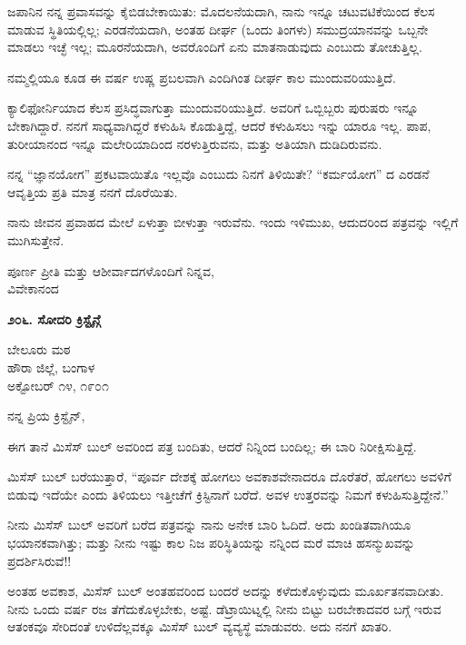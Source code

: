 ಜಪಾನಿನ ನನ್ನ ಪ್ರವಾಸವನ್ನು ಕೈಬಿಡಬೇಕಾಯಿತು: ಮೊದಲನೆಯದಾಗಿ, ನಾನು ಇನ್ನೂ ಚಟುವಟಿಕೆಯಿಂದ ಕೆಲಸ ಮಾಡುವ ಸ್ಥಿತಿಯಲ್ಲಿಲ್ಲ; ಎರಡನೆಯದಾಗಿ, ಅಂತಹ ದೀರ್ಘ (ಒಂದು ತಿಂಗಳು) ಸಮುದ್ರಯಾನವನ್ನು ಒಬ್ಬನೇ ಮಾಡಲು ಇಚ್ಛೆ ಇಲ್ಲ; ಮೂರನೆಯದಾಗಿ, ಅವರೊಂದಿಗೆ ಏನು ಮಾತನಾಡುವುದು ಎಂಬುದು ತೋಚುತ್ತಿಲ್ಲ.

ನಮ್ಮಲ್ಲಿಯೂ ಕೂಡ ಈ ವರ್ಷ ಉಷ್ಣ ಪ್ರಬಲವಾಗಿ ಎಂದಿಗಿಂತ ದೀರ್ಘ ಕಾಲ ಮುಂದುವರಿಯುತ್ತಿದೆ.

ಕ್ಯಾಲಿಫೋರ್ನಿಯಾದ ಕೆಲಸ ಪ್ರಸಿದ್ಧವಾಗುತ್ತಾ ಮುಂದುವರಿಯುತ್ತಿದೆ. ಅವರಿಗೆ ಒಬ್ಬಿಬ್ಬರು ಪುರುಷರು ಇನ್ನೂ ಬೇಕಾಗಿದ್ದಾರೆ. ನನಗೆ ಸಾಧ್ಯವಾಗಿದ್ದರೆ ಕಳುಹಿಸಿ ಕೊಡುತ್ತಿದ್ದೆ, ಆದರೆ ಕಳುಹಿಸಲು ಇನ್ನು ಯಾರೂ ಇಲ್ಲ. ಪಾಪ, ತುರೀಯಾನಂದ ಇನ್ನೂ ಮಲೇರಿಯಾದಿಂದ ನರಳುತ್ತಿರುವನು, ಮತ್ತು ಅತಿಯಾಗಿ ದುಡಿದಿರುವನು.

ನನ್ನ “ಜ್ಞಾನಯೋಗ” ಪ್ರಕಟವಾಯಿತೊ ಇಲ್ಲವೊ ಎಂಬುದು ನಿನಗೆ ತಿಳಿಯಿತೇ? “ಕರ್ಮಯೋಗ” ದ ಎರಡನೆ ಆವೃತ್ತಿಯ ಪ್ರತಿ ಮಾತ್ರ ನನಗೆ ದೊರೆಯಿತು.

ನಾನು ಜೀವನ ಪ್ರವಾಹದ ಮೇಲೆ ಏಳುತ್ತಾ ಬೀಳುತ್ತಾ ಇರುವೆನು. ಇಂದು ಇಳಿಮುಖ, ಆದುದರಿಂದ ಪತ್ರವನ್ನು ಇಲ್ಲಿಗೆ ಮುಗಿಸುತ್ತೇನೆ.

\begin{flushright}
ಪೂರ್ಣ ಪ್ರೀತಿ ಮತ್ತು ಆಶೀರ್ವಾದಗಳೊಂದಿಗೆ ನಿನ್ನವ,\\ವಿವೇಕಾನಂದ
\end{flushright}

\begin{center}
\textbf{೨೦೬. ಸೋದರಿ ಕ್ರಿಸ್ಟೈನ್ಗೆ}
\end{center}

\begin{flushright}
ಬೇಲೂರು ಮಠ\\ಹೌರಾ ಜಿಲ್ಲೆ, ಬಂಗಾಳ\\ಅಕ್ಟೋಬರ್ ೧೪, ೧೯೦೧
\end{flushright}

ನನ್ನ ಪ್ರಿಯ ಕ್ರಿಸ್ಟೈನ್,

ಈಗ ತಾನೆ ಮಿಸೆಸ್ ಬುಲ್ ಅವರಿಂದ ಪತ್ರ ಬಂದಿತು, ಆದರೆ ನಿನ್ನಿಂದ ಬಂದಿಲ್ಲ; ಈ ಬಾರಿ ನಿರೀಕ್ಷಿಸುತ್ತಿದ್ದೆ.

ಮಿಸೆಸ್ ಬುಲ್ ಬರೆಯುತ್ತಾರೆ, “ಪೂರ್ವ ದೇಶಕ್ಕೆ ಹೋಗಲು ಅವಕಾಶವೇನಾದರೂ ದೊರೆತರೆ, ಹೋಗಲು ಅವಳಿಗೆ ಬಿಡುವು ಇದೆಯೇ ಎಂದು ತಿಳಿಯಲು ಇತ್ತೀಚೆಗೆ ಕ್ರಿಸ್ಟಿನಾಗೆ ಬರೆದೆ. ಅವಳ ಉತ್ತರವನ್ನು ನಿಮಗೆ ಕಳುಹಿಸುತ್ತಿದ್ದೇನೆ.”

ನೀನು ಮಿಸೆಸ್ ಬುಲ್ ಅವರಿಗೆ ಬರೆದ ಪತ್ರವನ್ನು ನಾನು ಅನೇಕ ಬಾರಿ ಓದಿದೆ. ಅದು ಖಂಡಿತವಾಗಿಯೂ ಭಯಾನಕವಾಗಿತ್ತು; ಮತ್ತು ನೀನು ಇಷ್ಟು ಕಾಲ ನಿಜ ಪರಿಸ್ಥಿತಿಯನ್ನು ನನ್ನಿಂದ ಮರೆ ಮಾಚಿ ಹಸನ್ಮುಖವನ್ನು ಪ್ರದರ್ಶಿಸಿರುವೆ!!

ಅಂತಹ ಅವಕಾಶ, ಮಿಸೆಸ್ ಬುಲ್ ಅಂತಹವರಿಂದ ಬಂದರೆ ಅದನ್ನು ಕಳೆದುಕೊಳ್ಳುವುದು ಮೂರ್ಖತನವಾದೀತು. ನೀನು ಒಂದು ವರ್ಷ ರಜ ತೆಗೆದುಕೊಳ್ಳಬೇಕು, ಅಷ್ಟೆ. ಡೆಟ್ರಾಯಿಟ್ನಲ್ಲಿ ನೀನು ಬಿಟ್ಟು ಬರಬೇಕಾದವರ ಬಗ್ಗೆ ಇರುವ ಆತಂಕವೂ ಸೇರಿದಂತೆ ಉಳಿದೆಲ್ಲವಕ್ಕೂ ಮಿಸೆಸ್ ಬುಲ್ ವ್ಯವ್ಯಸ್ಥೆ ಮಾಡುವರು. ಅದು ನನಗೆ ಖಾತರಿ.

